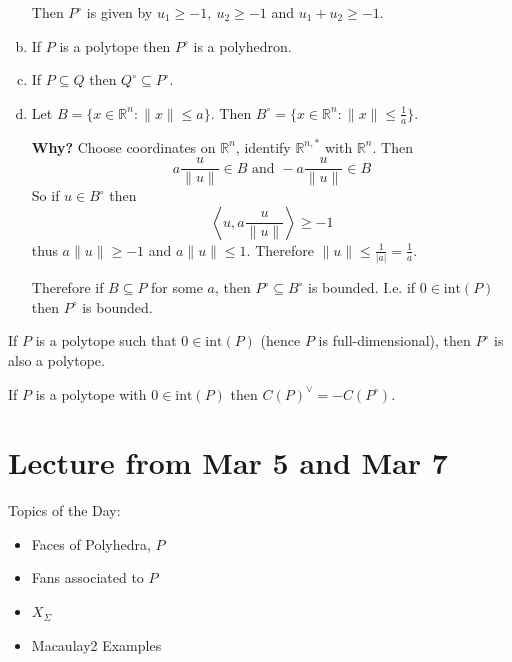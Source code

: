 \documentclass[a4paper,12pt]{amsart}
\begin{document}
\begin{enumerate}[(a)]
	
	Then $P^{\circ}$ is given by $ u_1 \geq -1,\ u_2 \geq -1$ and $u_1+u_2 \geq -1$.
	
	\begin{figure}[h]
		\begin{center}
		\end{center}
	\end{figure}
	
	\item If $P$ is a polytope then $P^{\circ}$ is a polyhedron.
	\item If $P \subseteq Q$ then $Q^{\circ} \subseteq P^{\circ}$.
	\item Let $B = \{ x \in \mathbb{R}^n : \| x\| \leq a \}$.  Then $B^{\circ} = \{ x\in \mathbb{R}^n : \| x\| \leq \frac{1}{a} \}$.
	
	{\bf Why?}  Choose coordinates on $\mathbb{R}^n$, identify $\mathbb{R}^{n,*}$ with $\mathbb{R}^n$.  Then 
	\[ a\frac{u}{\|u\|} \in B \text{ and } -a\frac{u}{\|u\|} \in B\]
	So if $u\in B^{\circ}$ then 
	\[\left\langle u, a \frac{u}{\|u\|} \right\rangle \geq -1\]
	thus $a\|u\| \geq -1$ and $a\|u\| \leq 1$.  Therefore $\|u\| \leq \frac{1}{|a|} = \frac{1}{a}$.
	
	Therefore if $B \subseteq P$ for some $a$, then $P^{\circ} \subseteq B^{\circ}$ is bounded.  I.e. if $0 \in \text{int}(P)$ then $P^{\circ}$ is bounded.
\end{enumerate}

\begin{Corollary}
	If $P$ is a polytope such that $0 \in \text{int}(P)$ (hence $P$ is full-dimensional), then $P^{\circ}$ is also a polytope.
\end{Corollary}

 If $P$ is a polytope with $0 \in \text{int}(P)$ then $C(P)^{\vee} = - C(P^{\circ})$.

\newpage
\section{Lecture from Mar 5 and Mar 7}
Topics of the Day: \begin{itemize}
	\item Faces of Polyhedra, $P$
	\item Fans associated to $P$
	\item $X_\Sigma$
	\item Macaulay2 Examples
\end{itemize}
\end{document}
